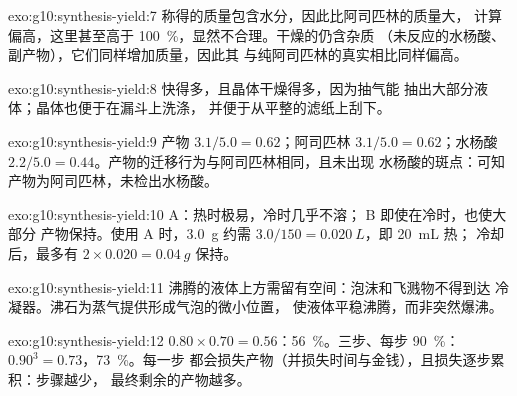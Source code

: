 \begin{solution}{exo:g10:synthesis-yield:7}
称得的质量包含水分，因此比阿司匹林的质量大，
计算偏高，这里甚至高于
\qty{100}{\percent}，显然不合理。干燥的仍含杂质
（未反应的水杨酸、副产物），它们同样增加质量，因此其
与纯阿司匹林的真实相比同样偏高。
\end{solution}

\begin{solution}{exo:g10:synthesis-yield:8}
快得多，且晶体干燥得多，因为抽气能
抽出大部分液体；晶体也便于在漏斗上洗涤，
并便于从平整的滤纸上刮下。
\end{solution}

\begin{solution}{exo:g10:synthesis-yield:9}
产物 $3.1/5.0 = 0.62$；阿司匹林 $3.1/5.0 = 0.62$；水杨酸
$2.2/5.0 = 0.44$。产物的迁移行为与阿司匹林相同，且未出现
水杨酸的斑点：可知产物为阿司匹林，未检出水杨酸。
\end{solution}

\begin{solution}{exo:g10:synthesis-yield:10}
 A：热时极易，冷时几乎不溶； B 即使在冷时，也使大部分
产物保持。使用 A 时，\qty{3.0}{g} 约需
$3.0 / 150 = \qty{0.020}{L}$，即 \qty{20}{mL} 热；
冷却后，最多有 $2 \times 0.020 = \qty{0.04}{g}$ 保持。
\end{solution}

\begin{solution}{exo:g10:synthesis-yield:11}
沸腾的液体上方需留有空间：泡沫和飞溅物不得到达
冷凝器。沸石为蒸气提供形成气泡的微小位置，
使液体平稳沸腾，而非突然爆沸。
\end{solution}

\begin{solution}{exo:g10:synthesis-yield:12}
$0.80 \times 0.70 = 0.56$：\qty{56}{\percent}。三步、每步
\qty{90}{\percent}：$0.90^3 = 0.73$，\qty{73}{\percent}。每一步
都会损失产物（并损失时间与金钱），且损失逐步累积：步骤越少，
最终剩余的产物越多。
\end{solution}

